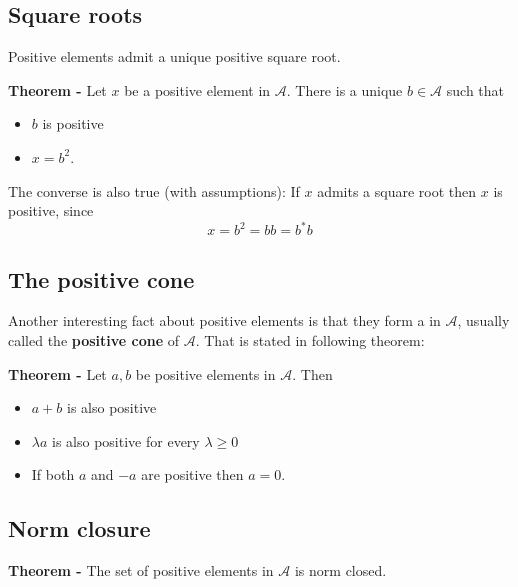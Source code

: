 \documentclass[12pt]{article}
\begin{document}
\subsection{Square roots}

Positive elements admit a unique positive square root.

{\bf Theorem -} Let $x$ be a positive element in  $\mathcal{A}$. There is a unique $b \in \mathcal{A}$ such that
\begin{itemize}
\item $b$ is positive
\item $x=b^2$.
\end{itemize}

The converse is also true (with  assumptions): If $x$ admits a  square root then $x$ is positive, since
\begin{displaymath}
x=b^2=bb=b^*b
\end{displaymath}

\subsection{The positive cone}

Another interesting fact about positive elements is that they form a  in $\mathcal{A}$, usually called the {\bf positive cone} of $\mathcal{A}$. That is stated in following theorem:

{\bf Theorem -} Let $a, b$ be positive elements in $\mathcal{A}$. Then
\begin{itemize}
\item $a+b$ is also positive
\item $\lambda a$ is also positive for every $\lambda \geq 0$
\item If both $a$ and $-a$ are positive then $a=0$.
\end{itemize}

\subsection{Norm closure}
{\bf Theorem -} The set of positive elements in $\mathcal{A}$ is norm closed.
\end{document}
